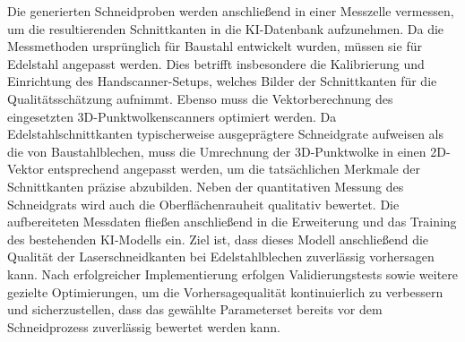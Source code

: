 Die generierten Schneidproben werden anschließend in einer Messzelle vermessen, um die resultierenden Schnittkanten in die KI-Datenbank aufzunehmen. Da die Messmethoden ursprünglich für Baustahl entwickelt wurden, müssen sie für Edelstahl angepasst werden. Dies betrifft insbesondere die Kalibrierung und Einrichtung des Handscanner-Setups, welches Bilder der Schnittkanten für die Qualitätsschätzung aufnimmt. Ebenso muss die Vektorberechnung des eingesetzten 3D-Punktwolkenscanners optimiert werden. Da Edelstahlschnittkanten typischerweise ausgeprägtere Schneidgrate aufweisen als die von Baustahlblechen, muss die Umrechnung der 3D-Punktwolke in einen 2D-Vektor entsprechend angepasst werden, um die tatsächlichen Merkmale der Schnittkanten präzise abzubilden.
Neben der quantitativen Messung des Schneidgrats wird auch die Oberflächenrauheit qualitativ bewertet.
Die aufbereiteten Messdaten fließen anschließend in die Erweiterung und das Training des bestehenden KI-Modells ein. Ziel ist, dass dieses Modell anschließend die Qualität der Laserschneidkanten bei Edelstahlblechen zuverlässig vorhersagen kann. Nach erfolgreicher Implementierung erfolgen Validierungstests sowie weitere gezielte Optimierungen, um die Vorhersagequalität kontinuierlich zu verbessern und sicherzustellen, dass das gewählte Parameterset bereits vor dem Schneidprozess zuverlässig bewertet werden kann.